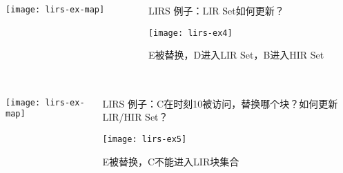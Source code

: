 \begin{frame}[plain]
	\frametitle{ }
	\begin{columns}
		\begin{column}{.4\textwidth}
			\centering
			\texttt{[image: lirs-ex-map]}
		\end{column}
		
		\begin{column}{.6\textwidth}
			LIRS 例子：LIR Set如何更新？
			
			\texttt{[image: lirs-ex4]}
			
			E被替换，D进入LIR Set，B进入HIR Set 
		\end{column}
		
		
	\end{columns}
\end{frame}


\begin{frame}[plain]
	\frametitle{ }
	\begin{columns}
		\begin{column}{.4\textwidth}
			\centering
			\texttt{[image: lirs-ex-map]}
		\end{column}
		
		\begin{column}{.6\textwidth}
			LIRS 例子：C在时刻10被访问，替换哪个块？如何更新LIR/HIR Set？
			
			\texttt{[image: lirs-ex5]}
			
			\pause
			\centering
			E被替换，C不能进入LIR块集合 
		\end{column}
		
		
	\end{columns}
\end{frame}


